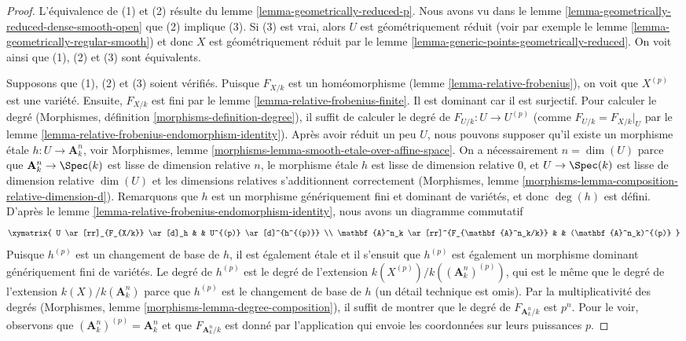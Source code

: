 \begin{proof}
L'équivalence de (1) et (2) résulte du
lemme \ref{lemma-geometrically-reduced-p}. Nous avons
vu dans le lemme
\ref{lemma-geometrically-reduced-dense-smooth-open} que (2) implique (3). Si
(3) est vrai, alors $U$ est géométriquement réduit (voir
par exemple le lemme
\ref{lemma-geometrically-regular-smooth}) et donc $X$ est
géométriquement réduit par le lemme
\ref{lemma-generic-points-geometrically-reduced}. On voit ainsi que (1), (2) et (3) sont équivalents.

\medskip\noindent
Supposons que (1), (2) et (3) soient vérifiés. Puisque
$F_{X/k}$ est un homéomorphisme (lemme
\ref{lemma-relative-frobenius}), on voit que $X^{(p)}$ est
une variété. Ensuite, $F_{X/k}$ est fini par le lemme
\ref{lemma-relative-frobenius-finite}. Il est dominant car il
est surjectif. Pour calculer le degré (Morphismes, définition
\ref{morphisms-definition-degree}), il suffit de calculer le
degré de $F_{U/k} : U \to U^{(p)}$ (comme $F_{U/k} = F_{X/k}|_U$
par le lemme
\ref{lemma-relative-frobenius-endomorphism-identity}). Après avoir
réduit un peu $U$, nous pouvons supposer qu'il existe un morphisme
étale $h : U \to \mathbf{A}^n_k$, voir Morphismes, lemme
\ref{morphisms-lemma-smooth-etale-over-affine-space}. On a nécessairement $n =
\dim(U)$ parce que $\mathbf{A}^n_k \to \Spec(k)$ est lisse de
dimension relative $n$, le morphisme étale $h$ est lisse de
dimension relative $0$, et $U \to \Spec(k)$ est lisse de dimension
relative $\dim(U)$ et les dimensions relatives s'additionnent
correctement (Morphismes, lemme
\ref{morphisms-lemma-composition-relative-dimension-d}). Remarquons que $h$ est un
morphisme génériquement fini et dominant de variétés, et donc $\deg(h)$ est défini. D'après le
lemme \ref{lemma-relative-frobenius-endomorphism-identity}, nous avons un diagramme commutatif
$$
\xymatrix{
U \ar[rr]_{F_{X/k}} \ar[d]_h & & U^{(p)} \ar[d]^{h^{(p)}} \\
\mathbf{A}^n_k \ar[rr]^{F_{\mathbf{A}^n_k/k}} & &
(\mathbf{A}^n_k)^{(p)}
}
$$
Puisque $h^{(p)}$ est un changement de base de $h$, il
est également étale et il s'ensuit que $h^{(p)}$ est
également un morphisme dominant génériquement fini de
variétés. Le degré de $h^{(p)}$ est le degré de
l'extension $k(X^{(p)})/k((\mathbf{A}^n_k)^{(p)})$, qui est
le même que le degré de l'extension
$k(X)/k(\mathbf{A}^n_k)$ parce que $h^{(p)}$ est le changement
de base de $h$ (un détail technique est omis). Par la multiplicativité des
degrés (Morphismes, lemme
\ref{morphisms-lemma-degree-composition}), il suffit de montrer que le
degré de $F_{\mathbf{A}^n_k/k}$ est $p^n$. Pour le voir, observons que
$(\mathbf{A}^n_k)^{(p)} = \mathbf{A}^n_k$ et que $F_{\mathbf{A}^n_k/k}$
est donné par l'application qui envoie les coordonnées sur leurs puissances $p$.
\end{proof}

